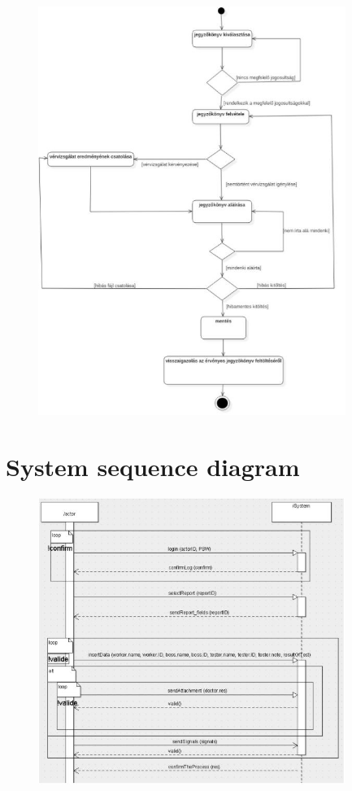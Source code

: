 \begin{figure}[!h]
	\centering
	\includegraphics[width=100mm, keepaspectratio]{figures/aktivitas.jpg}
\end{figure}
\newpage
\section{System sequence diagram}

\begin{figure}[!h]
	\centering
	\includegraphics[width=100mm, keepaspectratio]{figures/ssd1.jpg}
\end{figure}


